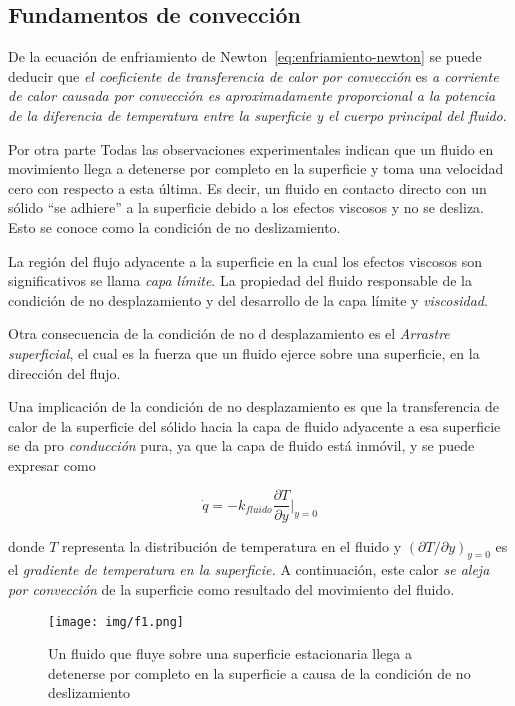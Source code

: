 \subsection{Fundamentos de convección}
De la ecuación de enfriamiento de Newton~\ref{eq:enfriamiento-newton}
se puede deducir que \textit{el coeficiente de transferencia de calor por convección}
es \textit{a corriente de calor causada por convección es aproximadamente proporcional a la potencia de la diferencia de temperatura entre la superficie y el cuerpo
principal del fluido}. 

Por otra parte Todas las observaciones experimentales indican que un fluido en movimiento llega a detenerse por completo en la superficie y toma una velocidad
cero con respecto a esta última. Es decir, un fluido en contacto directo con un
sólido “se adhiere” a la superficie debido a los efectos viscosos y no se desliza. Esto se conoce como la condición de no deslizamiento.

La región del flujo adyacente a la superficie en
la cual los efectos viscosos son significativos
se llama \textit{capa límite}. La propiedad
del fluido responsable de la condición de no desplazamiento 
y del desarrollo de la capa límite y \textit{viscosidad}.

Otra consecuencia de la condición de no d
desplazamiento es el \textit{Arrastre superficial}, 
el cual es la fuerza que un fluido ejerce sobre una superficie,
en la dirección del flujo.

Una implicación de la condición de no desplazamiento es que la transferencia
de calor de la superficie del sólido hacia la capa de fluido adyacente a esa superficie
se da pro \textit{conducción} pura, ya 
que la capa de fluido está inmóvil, y se puede expresar como

\begin{equation}
    \dot{q} = -k_{fluido}\frac{\partial T}{\partial y}|_{y=0}
\end{equation}

donde $T$ representa la distribución de temperatura en el fluido
y ${(\partial T / \partial y)}_{y=0}$ es el \textit{gradiente de temperatura en la superficie.}
A continuación, este calor \textit{se aleja por convección} de
la superficie como resultado del movimiento del fluido.

\begin{figure}[ht]
    \begin{center}
        \texttt{[image: img/f1.png]}
    \end{center}
    \caption{Un fluido que fluye sobre una superficie estacionaria
    llega a detenerse por completo en la superficie a causa de la condición de no deslizamiento}
\end{figure}

